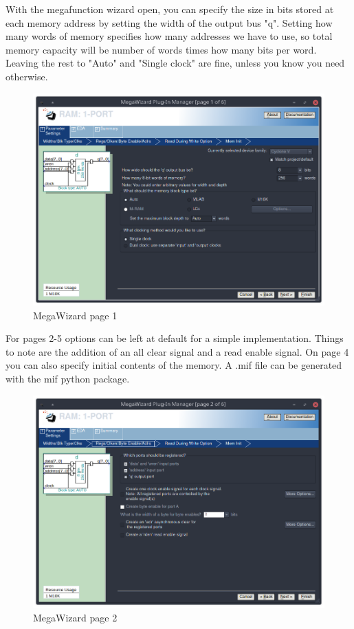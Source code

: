 \documentclass[letter,12pt]{article}
\begin{document}
With the megafunction wizard open, you can specify the size in bits stored at each memory address by setting the width of the output bus "q". Setting how many words of memory specifies how many addresses we have to use, so total memory capacity will be number of words times how many bits per word. Leaving the rest to "Auto" and "Single clock" are fine, unless you know you need otherwise.

\begin{figure}[H]
  \centering
  \includegraphics[width=.83\linewidth]{pics/Mega1.png}
  \caption{MegaWizard page 1}
\end{figure}
For pages 2-5 options can be left at default for a simple implementation. Things to note are the addition of an  all clear signal and a read enable signal. On page 4 you can also specify initial contents of the memory. A .mif file can be generated with the mif python package.
\begin{figure}[H]
  \centering
  \includegraphics[width=.83\linewidth]{pics/Mega2.png}
  \caption{MegaWizard page 2}
\end{figure}
\end{document}

